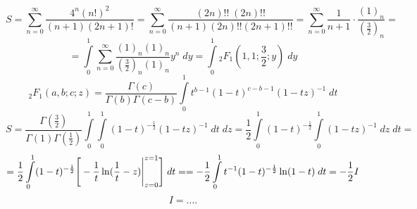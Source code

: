 


	$$S = \sum_{n = 0}^{\infty} \frac{4^n (n!)^2}{(n+1)(2n+1)!} = \sum_{n = 0}^{\infty} \frac{(2n)!! \; (2n)!!}{(n+1) (2n)!! (2n+1)!!} = \sum_{n = 0}^{\infty} \frac{1}{n+1} \cdot \frac{(1)_n}{(\frac{3}{2})_n} =$$
	$$= \int \limits_0^1 \sum_{n = 0}^{\infty} \frac{(1)_n (1)_n}{(\frac{3}{2})_n (1)_n} y^n \; dy = \int \limits_0^1 {}_2F_1 (1, 1; \frac{3}{2}; y) \; dy$$
	$${}_2F_1 (a, b; c; z) = \frac{\Gamma(c)}{\Gamma(b) \Gamma(c-b)} \int \limits_0^1 t^{b-1} (1-t)^{c-b-1} (1-tz)^{-1}\; dt$$
	$$S = \frac{\Gamma(\frac{3}{2})}{\Gamma(1) \Gamma(\frac{1}{2})} \int \limits_0^1 \int \limits_0^1 (1-t)^{-\frac{1}{2}} (1-tz)^{-1}\; dt \; dz = \frac{1}{2} \int \limits_0^1 (1-t)^{-\frac{1}{2}} \int \limits_0^1 (1-tz)^{-1} \; dz \; dt =$$
	$$= \frac{1}{2} \int \limits_0^1 (1-t)^{-\frac{1}{2}} \Bigg{[} -\frac{1}{t} \ln(\frac{1}{t} - z) \Bigg|_{z = 0}^{z = 1} \Bigg{]} \; dt = = -\frac{1}{2} \int \limits_0^1 t^{-1} (1-t)^{-\frac{1}{2}} \ln(1-t) \; dt = -\frac{1}{2} I$$
	$$I = ....$$
